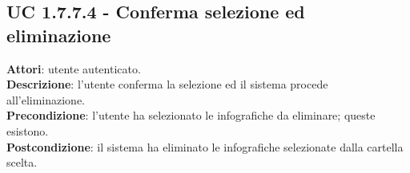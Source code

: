 		\subsection{UC 1.7.7.4 - Conferma selezione ed eliminazione}{
			\label{uc1.7.7.4}
			\textbf{Attori}: utente autenticato. \\
			\textbf{Descrizione}: l'utente conferma la selezione ed il sistema procede all'eliminazione. \\
			\textbf{Precondizione}: l'utente ha selezionato le infografiche da eliminare; queste esistono.	\\
			\textbf{Postcondizione}: il sistema ha eliminato le infografiche selezionate dalla cartella scelta.	\\
			}
